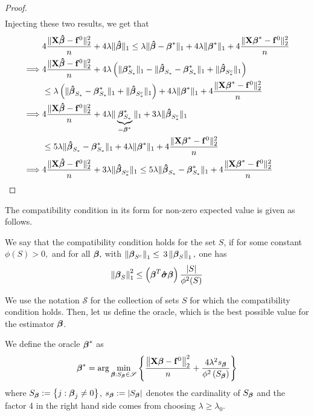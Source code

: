 \begin{proof}
\begin{align*}
    \end{align*}
    Injecting these two results, we get that
    \begin{align*}
                 & 4 \frac{\| \mathbf{X} \boldsymbol{\hat{\beta}} - \mathbf{f}^0 \|_{2}^{2}}{n} + 4 \lambda\| \boldsymbol{\hat{\beta}} \|_{1} \leq \lambda \| \boldsymbol{\hat{\beta}} - \boldsymbol{\beta}^* \|_{1} + 4 \lambda \| \boldsymbol{\beta}^*\|_{1} + 4\frac{\|\mathbf{X} \boldsymbol{\beta}^* - \mathbf{f}^0\|_{2}^{2}}{n} \\
        \implies &
        4 \frac{\| \mathbf{X} \boldsymbol{\hat{\beta}} - \mathbf{f}^0 \|_{2}^{2}}{n} + 4 \lambda \left( \|\boldsymbol{\beta}_{S_{*}}^{*} \|_{1} - \|\boldsymbol{\hat{\beta}}_{S_{*}}-\boldsymbol{\beta}_{S_{*}}^{*} \|_{1}+ \|\boldsymbol{\hat{\beta}}_{S_{*}^{c}} \|_{1} \right)                        \\
                 & \leq \lambda \left( \| \boldsymbol{\hat{\beta}}_{S_{*}}-\boldsymbol{\beta}_{S_{*}}^{*} \|_{1} + \|\boldsymbol{\hat{\beta}}_{S_{*}^{c}} \|_{1} \right) + 4 \lambda \| \boldsymbol{\beta}^*\|_{1} + 4\frac{\|\mathbf{X} \boldsymbol{\beta}^* - \mathbf{f}^0\|_{2}^{2}}{n}            \\
        \implies &
        4 \frac{\| \mathbf{X} \boldsymbol{\hat{\beta}} - \mathbf{f}^0 \|_{2}^{2}}{n} + 4 \lambda \| \underbrace{\boldsymbol{\beta}_{S_{*}}^{*}}_{= \boldsymbol{\beta}^{*}} \|_{1} + 3 \lambda\|\boldsymbol{\hat{\beta}}_{S_{*}^{c}} \|_{1}                                              \\
                 & \leq 5 \lambda \| \boldsymbol{\hat{\beta}}_{S_{*}}-\boldsymbol{\beta}_{S_{*}}^{*} \|_{1} + 4 \lambda \| \boldsymbol{\beta}^*\|_{1} + 4\frac{\|\mathbf{X} \boldsymbol{\beta}^* - \mathbf{f}^0\|_{2}^{2}}{n}                                                        \\
        \implies &
        4 \frac{\| \mathbf{X} \boldsymbol{\hat{\beta}} - \mathbf{f}^0 \|_{2}^{2}}{n} + 3 \lambda\|\boldsymbol{\hat{\beta}}_{S_{*}^{c}} \|_{1} \leq 5 \lambda \| \boldsymbol{\hat{\beta}}_{S_{*}}-\boldsymbol{\beta}_{S_{*}}^{*} \|_{1} + 4\frac{\|\mathbf{X} \boldsymbol{\beta}^* - \mathbf{f}^0\|_{2}^{2}}{n}           \\
    \end{align*}
\end{proof}
The compatibility condition in its form for non-zero expected value is given as follows.
\begin{definition}
    We say that the compatibility condition holds for the set $S$, if for some constant $\phi(S)>0,$ and for all $\boldsymbol{\beta},$ with $\left\|\boldsymbol{\beta}_{S^{c}}\right\|_{1} \leq$ $3\left\|\boldsymbol{\beta}_{S}\right\|_{1},$ one has
    \[
        \left\|\boldsymbol{\beta}_{S}\right\|_{1}^{2} \leq\left(\boldsymbol{\beta}^{T} \boldsymbol{\hat{\sigma}} \boldsymbol{\beta}\right)\frac{|S|}{\phi^{2}(S)}
    \]
\end{definition}
We use the notation $\mathscr{S}$ for the collection of sets $S$ for which the compatibility condition holds. Then, let us define the oracle, which is the best possible value for the estimator \(\boldsymbol{\beta}\).
\begin{definition}
    We define the oracle $\boldsymbol{\beta}^{*}$ as
    \[
        \boldsymbol{\beta}^{*} = \arg \min_{\boldsymbol{\beta}: S_{\boldsymbol{\beta}} \in \mathscr{S}} \left\{ \frac{ \left\| \mathbf{X} \boldsymbol{\beta} - \mathbf{f}^{0} \right\|_{2}^{2}}{n} + \frac{4 \lambda^{2} s_{\boldsymbol{\beta}}}{\phi^{2}\left(S_{\boldsymbol{\beta}}\right)}\right\}
    \]
    where $S_{\boldsymbol{\beta}}:=\left\{j: \boldsymbol{\beta}_{j} \neq 0\right\}$, $s_{\boldsymbol{\beta}}:=\left|S_{\boldsymbol{\beta}}\right|$ denotes the cardinality of $S_{\boldsymbol{\beta}}$ and the factor 4 in the right hand side comes from choosing $\lambda \geq \lambda_0$.
\end{definition}
